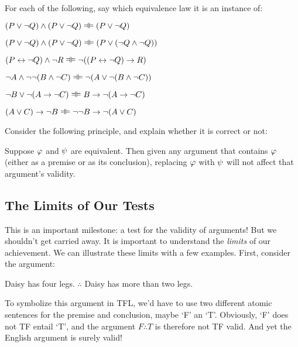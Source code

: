 \noindent For each of the following, say which equivalence law it is an instance of:

\begin{earg}
\item $(P \eor \enot Q) \land (P \eor \enot Q) \lequiv (P \lor \lnot Q)$
\item $(P \eor \enot Q) \land (P \eor \enot Q) \lequiv (P \lor (\lnot Q \land \lnot Q))$
\item $(P \leftrightarrow \lnot Q) \land \lnot R \lequiv \lnot((P \leftrightarrow \lnot Q) \rightarrow R)$ 
\item $\lnot A \land \lnot \lnot (B \land \lnot C) \lequiv \enot(A \eor \enot (B \eand  \enot C))$ 
\item $\enot B \eor \enot (A \eif \enot C) \lequiv B \rightarrow \lnot (A \rightarrow \lnot C)$
\item $(A \eor C) \eif \enot B \lequiv \lnot \lnot B \rightarrow \lnot (A \lor C)$

\end{earg}



\problempart
Consider the following principle, and explain whether it is correct or not:
	\begin{ebullet}
		\item Suppose $\mathcal{\varphi}$ and $\mathcal{\psi}$ are equivalent. Then given any argument that contains $\mathcal{\varphi}$ (either as a premise or as its conclusion), replacing $\mathcal{\varphi}$ with $\mathcal{\psi}$  will not affect that argument's validity.
	\end{ebullet}


\subsection{The Limits of Our Tests}\label{s:TFTestLimits}

This is an important milestone: a test for the validity of arguments! But we shouldn't get carried away.  It is important to understand the \emph{limits} of our achievement. We can illustrate these limits with a few examples.  First, consider the argument:
 	\begin{earg}
	\setcounter{eargnum}{0}
		\item Daisy has four legs. $\therefore$ Daisy has more than two legs.
	\end{earg}
To symbolize this argument in TFL, we'd have to use two different atomic sentences for the premise and conclusion, maybe `F' an `T'. Obviously, `F' does not TF entail `T', and the argument $F \therefore T$ is therefore not TF valid.  And yet the English argument is surely valid!

